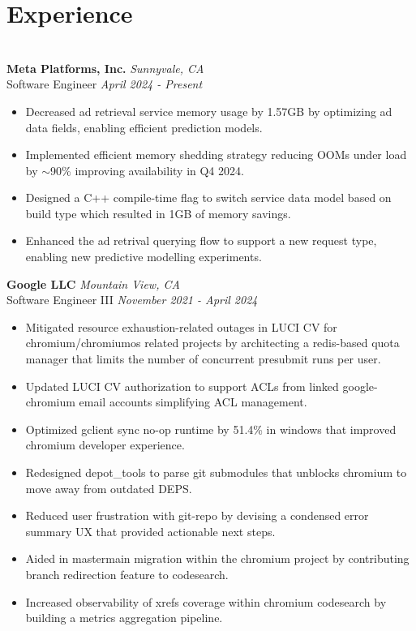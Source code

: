 \documentclass{resume}
\author{https://aravindvasu.dev}{Aravind Vasudevan}
\begin{document}
\maketitle
\section*{Experience}
\titlerule[0.2pt]
\noindent
\\
\textbf{Meta Platforms, Inc.} \hfill \textit{Sunnyvale, CA} \\
{\small Software Engineer} \hfill \textit{\small April 2024 - Present}
\begin{itemize}
  \item Decreased ad retrieval service memory usage by 1.57GB by optimizing ad data fields, enabling efficient prediction models.
  \item Implemented efficient memory shedding strategy reducing OOMs under load by $\sim$90\% improving availability in Q4 2024.
  \item Designed a C++ compile-time flag to switch service data model based on build type which resulted in 1GB of memory savings.
  \item Enhanced the ad retrival querying flow to support a new request type, enabling new predictive modelling experiments.
\end{itemize}
\textbf{Google LLC} \hfill \textit{Mountain View, CA} \\
{\small Software Engineer III} \hfill \textit{\small November 2021 - April 2024}
\begin{itemize}
  \item Mitigated resource exhaustion-related outages in LUCI CV for chromium/chromiumos related projects by architecting a redis-based quota manager that limits the number of concurrent presubmit runs per user.
  \item Updated LUCI CV authorization to support ACLs from linked google-chromium email accounts simplifying ACL management.
  \item Optimized gclient sync no-op runtime by 51.4\% in windows that improved chromium developer experience.
  \item Redesigned depot\_tools to parse git submodules that unblocks chromium to move away from outdated DEPS.
  \item Reduced user frustration with git-repo by devising a condensed error summary UX that provided actionable next steps.
  \item Aided in master\textrightarrow main migration within the chromium project by contributing branch redirection feature to codesearch.
  \item Increased observability of xrefs coverage within chromium codesearch by building a metrics aggregation pipeline.
\end{itemize}
\end{document}
